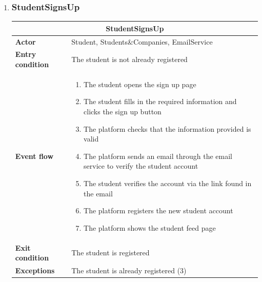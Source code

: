 \begin{enumerate}[label=\textbf{UC\arabic* -}]

\item \subsubsection{StudentSignsUp}

\begin{table}[H]
    \centering
    \begin{tabular}{|l|m{10cm}|}
        \hline \multicolumn{2}{|c|}{\textbf{StudentSignsUp}} \\
        \hline \textbf{Actor} & Student, Students\&Companies, EmailService \\
        \hline \textbf{Entry condition} & The student is not already registered \\
        \hline \textbf{Event flow} &
            \begin{enumerate}[label=\arabic*]
                \item The student opens the sign up page
                \item The student fills in the required information and clicks the sign up button
                \item The platform checks that the information provided is valid
                \item The platform sends an email through the email service to verify the student account
                \item The student verifies the account via the link found in the email
                \item The platform registers the new student account
                \item The platform shows the student feed page
            \end{enumerate} \\
        \hline \textbf{Exit condition} & The student is registered \\
        \hline \textbf{Exceptions} & The student is already registered (3) \\
        \hline
    \end{tabular}
\end{table}


\end{enumerate}
